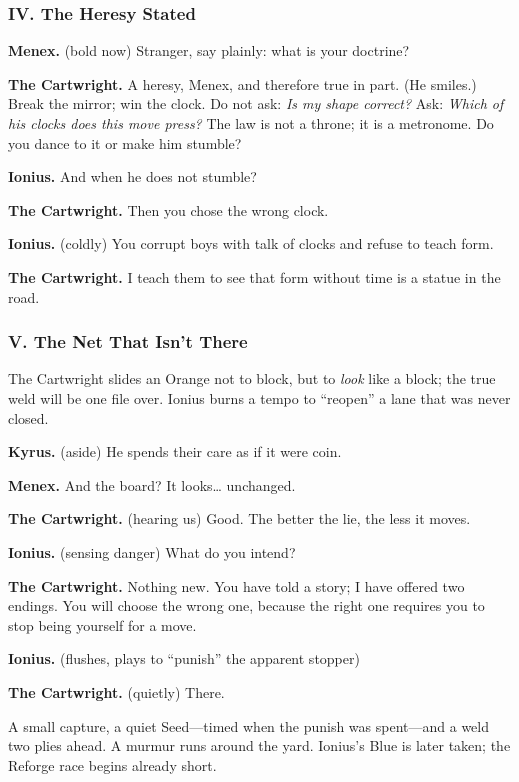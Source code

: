 \documentclass[11pt]{article}
\begin{document}
\medskip
\subsubsection*{IV. The Heresy Stated}
\noindent\textbf{Menex.} (bold now) Stranger, say plainly: what is your doctrine?

\noindent\textbf{The Cartwright.} A heresy, Menex, and therefore true in part. (He smiles.) Break the mirror; win the clock. Do not ask: \emph{Is my shape correct?} Ask: \emph{Which of his clocks does this move press?} The law is not a throne; it is a metronome. Do you dance to it or make him stumble?

\noindent\textbf{Ionius.} And when he does not stumble?

\noindent\textbf{The Cartwright.} Then you chose the wrong clock.

\noindent\textbf{Ionius.} (coldly) You corrupt boys with talk of clocks and refuse to teach form.

\noindent\textbf{The Cartwright.} I teach them to see that form without time is a statue in the road.

\medskip
\subsubsection*{V. The Net That Isn’t There}
The Cartwright slides an Orange not to block, but to \emph{look} like a block; the true weld will be one file over. Ionius burns a tempo to “reopen” a lane that was never closed.

\noindent\textbf{Kyrus.} (aside) He spends their care as if it were coin.

\noindent\textbf{Menex.} And the board? It looks… unchanged.

\noindent\textbf{The Cartwright.} (hearing us) Good. The better the lie, the less it moves.

\noindent\textbf{Ionius.} (sensing danger) What do you intend?

\noindent\textbf{The Cartwright.} Nothing new. You have told a story; I have offered two endings. You will choose the wrong one, because the right one requires you to stop being yourself for a move.

\noindent\textbf{Ionius.} (flushes, plays to “punish” the apparent stopper)

\noindent\textbf{The Cartwright.} (quietly) There.

A small capture, a quiet Seed—timed when the punish was spent—and a weld two plies ahead. A murmur runs around the yard. Ionius’s Blue is later taken; the Reforge race begins already short.
\end{document}
